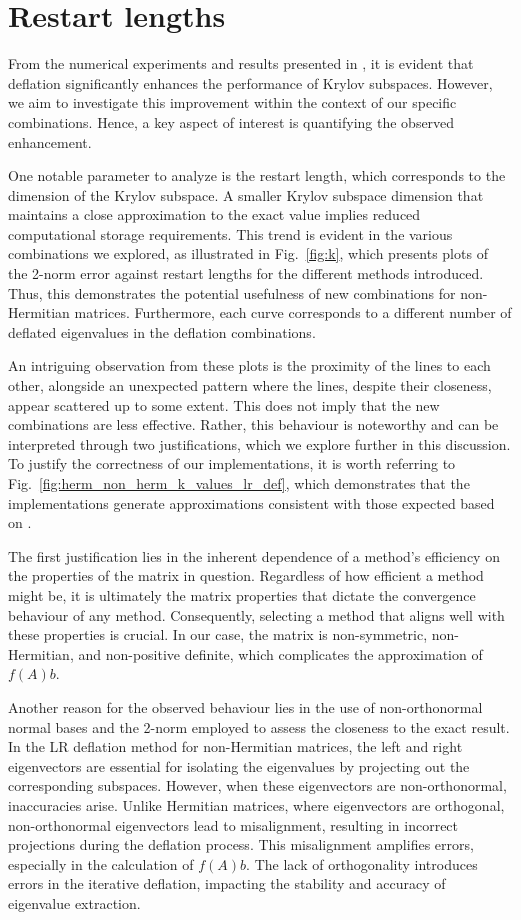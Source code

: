 \section{Restart lengths}
\label{sec:restart_lengths}

From the numerical experiments and results presented in \cite{11, 52}, it is evident that deflation significantly enhances the performance of Krylov subspaces. However, we aim to investigate this improvement within the context of our specific combinations. Hence, a key aspect of interest is quantifying the observed enhancement.

One notable parameter to analyze is the restart length, which corresponds to the dimension of the Krylov subspace. A smaller Krylov subspace dimension that maintains a close approximation to the exact value implies reduced computational storage requirements. This trend is evident in the various combinations we explored, as illustrated in Fig.~\ref{fig:k}, which presents plots of the 2-norm error against restart lengths for the different methods introduced. Thus, this demonstrates the potential usefulness of new combinations for non-Hermitian matrices. Furthermore, each curve corresponds to a different number of deflated eigenvalues in the deflation combinations.

An intriguing observation from these plots is the proximity of the lines to each other, alongside an unexpected pattern where the lines, despite their closeness, appear scattered up to some extent. This does not imply that the new combinations are less effective. Rather, this behaviour is noteworthy and can be interpreted through two justifications, which we explore further in this discussion. To justify the correctness of our implementations, it is worth referring to Fig.~\ref{fig:herm_non_herm_k_values_lr_def}, which demonstrates that the implementations generate approximations consistent with those expected based on \cite{11}.

The first justification lies in the inherent dependence of a method's efficiency on the properties of the matrix in question. Regardless of how efficient a method might be, it is ultimately the matrix properties that dictate the convergence behaviour of any method. Consequently, selecting a method that aligns well with these properties is crucial. In our case, the matrix is non-symmetric, non-Hermitian, and non-positive definite, which complicates the approximation of \(f(A)b\).

Another reason for the observed behaviour lies in the use of non-orthonormal normal bases and the 2-norm employed to assess the closeness to the exact result. In the LR deflation method for non-Hermitian matrices, the left and right eigenvectors are essential for isolating the eigenvalues by projecting out the corresponding subspaces. However, when these eigenvectors are non-orthonormal, inaccuracies arise. Unlike Hermitian matrices, where eigenvectors are orthogonal, non-orthonormal eigenvectors lead to misalignment, resulting in incorrect projections during the deflation process. This misalignment amplifies errors, especially in the calculation of \( f(A) b \). The lack of orthogonality introduces errors in the iterative deflation, impacting the stability and accuracy of eigenvalue extraction.

